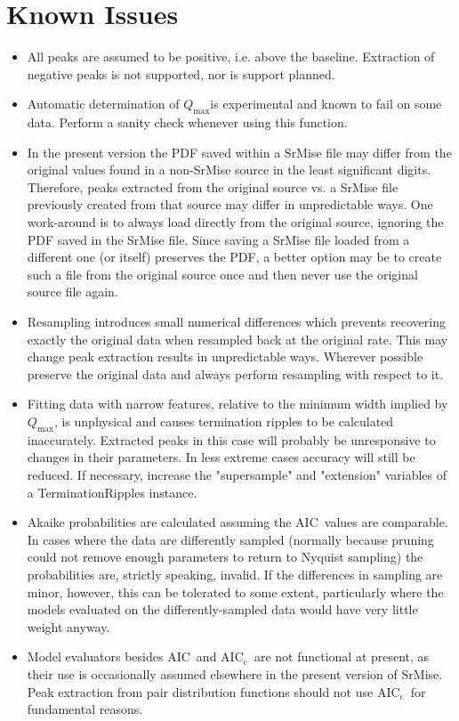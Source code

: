 \documentclass[12pt]{article}
\newcommand{\rmsub}[2]{\ensuremath{\mathrm{#1}_{\mathrm{#2}}}}
\newcommand{\aic}{\ensuremath{\mathrm{AIC}}}
\newcommand{\aicc}{\rmsub{AIC}{c}}
\newcommand{\qmax}{\ensuremath{Q_{\mathrm{max}}}}
\begin{document}
\section{Known Issues}
\begin{itemize}
   \item All peaks are assumed to be positive, i.e. above the baseline.  Extraction of negative peaks is not supported, nor is support planned.
   \item Automatic determination of \qmax is experimental and known to fail on some data. Perform a sanity check whenever using this function.
   \item In the present version the PDF saved within a {\sc SrMise} file may differ from the original values found in a non-{\sc SrMise} source in the least significant digits.  Therefore, peaks extracted from the original source vs. a {\sc SrMise} file previously created from that source may differ in unpredictable ways.  One work-around is to always load directly from the original source, ignoring the PDF saved in the {\sc SrMise} file.  Since saving a {\sc SrMise} file loaded from a different one (or itself) preserves the PDF, a better option may be to create such a file from the original source once and then never use the original source file again.
   \item Resampling introduces small numerical differences which prevents recovering exactly the original data when resampled back at the original rate.  This may change peak extraction results in unpredictable ways. Wherever possible preserve the original data and always perform resampling with respect to it.
   \item Fitting data with narrow features, relative to the minimum width implied by \qmax, is unphysical and causes termination ripples to be calculated inaccurately. Extracted peaks in this case will probably be unresponsive to changes in their parameters.  In less extreme cases accuracy will still be reduced.  If necessary, increase the "supersample" and "extension" variables of a TerminationRipples instance.
   \item Akaike probabilities are calculated assuming the \aic~values are comparable.  In cases where the data are differently sampled (normally because pruning could not remove enough parameters to return to Nyquist sampling) the probabilities are, strictly speaking, invalid.  If the differences in sampling are minor, however, this can be tolerated to some extent, particularly where the models evaluated on the differently-sampled data would have very little weight anyway.
   \item Model evaluators besides \aic~and \aicc~are not functional at present, as their use is occasionally assumed elsewhere in the present version of {\sc SrMise}.  Peak extraction from pair distribution functions should not use \aicc~for fundamental reasons.
 \end{itemize}



\end{document}
